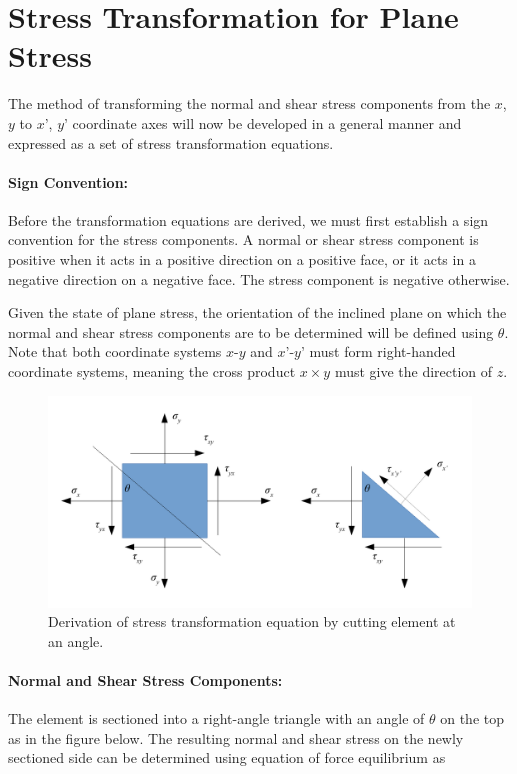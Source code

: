 \documentclass[
10pt,
a4paper,
openany,
svgnames,
]{book} %
\begin{document}
\section{Stress Transformation for Plane Stress}

The method of transforming the normal and shear stress components from the $x$, $y$ to $x’$, $y’$ coordinate axes will now be developed in a general manner and expressed as a set of stress transformation equations.

\paragraph{Sign Convention:} Before the transformation equations are derived, we must first establish a sign convention for the stress components. A normal or shear stress component is positive when it acts in a positive direction on a positive face, or it acts in a negative direction on a negative face. The stress component is negative otherwise.

Given the state of plane stress, the orientation of the inclined plane on which the normal and shear stress components are to be determined will be defined using $\theta$. Note that both coordinate systems $x$-$y$ and $x’$-$y’$ must form right-handed coordinate systems, meaning the cross product $x \times y$ must give the direction of $z$.

\begin{figure}[h]
  \centering
  \includegraphics[scale=0.7]{pictures/Static-body-load-analysis/stress-transformation}
  \caption{Derivation of stress transformation equation by cutting element at an angle.}
  \label{fig: stress transformation}
\end{figure}

\paragraph{Normal and Shear Stress Components:} The element is sectioned into a right-angle triangle with an angle of $\theta$ on the top as in the figure below. The resulting normal and shear stress on the newly sectioned side can be determined using equation of force equilibrium as
\end{document}
